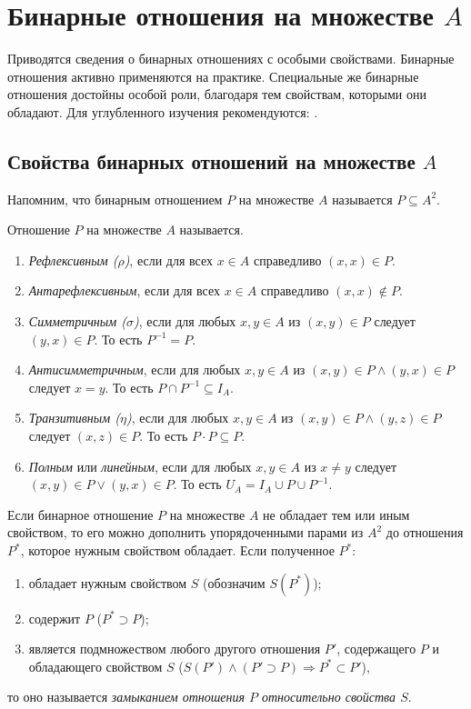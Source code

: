 \chapter{Бинарные отношения на множестве $A$}
\label{ch:bo}
Приводятся сведения о бинарных отношениях с особыми свойствами. Бинарные отношения активно применяются на практике. Специальные же бинарные отношения достойны особой роли, благодаря тем свойствам, которыми они обладают. Для углубленного изучения рекомендуются: \cite{bib:novic:discrmathprogrammer,bib:sudoplatov:discrmath,bib:shaporev:discretemath}.


\section{Свойства бинарных отношений на множестве $A$}

Напомним, что бинарным отношением $P$ на множестве $A$ называется $P\subseteq A^2$. 

Отношение $P$ на множестве $A$ называется.
\begin{enumerate}
    \item \emph{Рефлексивным ($\rho$)}, если для всех $x\in A$ справедливо $(x,x)\in P$.

    \item \emph{Антарефлексивным}, если для всех $x\in A$ справедливо $(x,x)\not\in P$.

    \item \emph{Симметричным ($\sigma$)}, если для любых $x,y\in A$ из $(x,y)\in P$ следует $(y,x)\in P$. То есть $P^{-1}=P$.

    \item \emph{Антисимметричным}, если для любых $x,y\in A$ из $(x,y)\in P\land(y,x)\in P$ следует $x=y$. То есть $P\cap P^{-1}\subseteq I_A$.    
    
    \item \emph{Транзитивным ($\eta$)}, если для любых $x,y\in A$ из $(x,y)\in P\land (y,z)\in P$ следует $(x,z)\in P$. То есть $P\cdot P\subseteq P$.
    
    \item \emph{Полным} или \emph{линейным}, если для любых $x,y\in A$ из $x\neq y$ следует $(x,y)\in P\lor (y,x)\in P$. То есть $U_A=I_A\cup P\cup P^{-1}$.
\end{enumerate}
 
Если бинарное отношение $P$ на множестве $A$ не обладает тем или иным свойством, то его можно дополнить упорядоченными парами из $A^2$ до отношения $P^*$, которое нужным свойством обладает. Если полученное $P^*$:
\begin{enumerate}
    \item обладает нужным свойством $S$ (обозначим $S(P^*)$);
    \item содержит $P$ ($P^*\supset P$);
    \item является подмножеством любого другого отношения $P'$, содержащего $P$ и обладающего свойством $S$ ($S(P')\land (P'\supset P)\Rightarrow P^*\subset P'$),
\end{enumerate}
то оно называется \emph{замыканием отношения $P$ относительно свойства $S$}.

